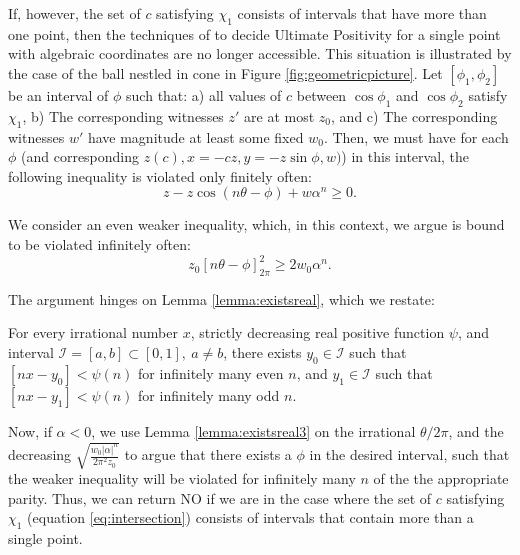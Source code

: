 If, however, the set of $c$ satisfying $\chi_1$ consists of intervals that have more than one point, then the techniques of \cite{ouaknine2014ultimate} to decide Ultimate Positivity for a single point with algebraic coordinates are no longer accessible. This situation is illustrated by the case of the ball nestled in cone in Figure \ref{fig:geometricpicture}. Let $[\phi_1, \phi_2]$ be an interval of $\phi$ such that: a) all values of $c$ between $\cos\phi_1$ and $\cos\phi_2$ satisfy $\chi_1$, b) The corresponding witnesses $z'$ are at most $z_0$, and c) The corresponding witnesses $w'$ have magnitude at least some fixed $w_0$. Then, we must have for each $\phi$ (and corresponding $z(c), x = -cz, y = -z\sin \phi, w)$) in this interval, the following inequality is violated only finitely often:
\begin{equation}
z - z\cos(n\theta - \phi) + w\alpha^n \ge 0.
\end{equation}

We consider an even weaker inequality, which, in this context, we argue is bound to be violated infinitely often:
\begin{equation}
z_0[n\theta - \phi]_{2\pi}^2  \ge 2w_0\alpha^n.
\end{equation}

The argument hinges on Lemma \ref{lemma:existsreal}, which we restate:
\begin{lemma}
\label{lemma:existsreal3}
For every irrational number $x$, strictly decreasing real positive function $\psi$, and interval $\mathcal{I} = [a, b] \subset [0, 1], ~ a \ne b$, there exists $y_0 \in \mathcal{I}$ such that $[nx - y_0] < \psi(n)$ for infinitely many even $n$, and $y_1 \in \mathcal{I}$ such that $[nx - y_1] < \psi(n)$ for infinitely many odd $n$.
\end{lemma}

Now, if $\alpha < 0$, we use Lemma \ref{lemma:existsreal3} on the irrational $\theta/2\pi$, and the decreasing $\sqrt{\frac{w_0 |\alpha|^n}{2\pi^2z_0}}$ to argue that there exists a $\phi$ in the desired interval, such that the weaker inequality will be violated for infinitely many $n$ of the the appropriate parity. Thus, we can return NO if we are in the case where the set of $c$ satisfying $\chi_1$ (equation \ref{eq:intersection}) consists of intervals that contain more than a single point.

